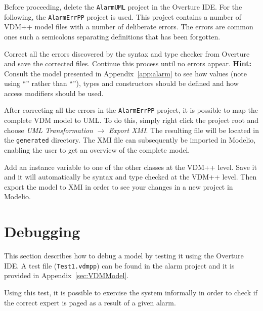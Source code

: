 Before proceeding, delete the \texttt{AlarmUML} project in the Overture IDE. For the following, the \texttt{AlarmErrPP} project is used. This project contains a number of VDM++ model files with a number of deliberate errors.  The errors are common ones such a semicolons separating definitions that has been forgotten.

\begin{myexercise}\label{ex:type-errors}
Correct all the errors discovered by the syntax and type checker from
Overture and save the corrected files. Continue this process until no errors appear.
\textbf{Hint:} Consult the model presented in
Appendix~\ref{app:alarm}
to see how values (note using ``\vdmstyle{=}'' rather than
``\vdmstyle{:=}''), types and constructors should be defined and how
access modifiers should be used.
\end{myexercise}


After correcting all the errors in the \texttt{AlarmErrPP} project, it is possible to map the complete VDM model to UML. To do this, simply right click the project root and choose \emph{UML Transformation} $\rightarrow $ \emph{Export XMI}. The resulting file will be located in the \texttt{generated} directory.  The XMI file can subsequently be
imported in Modelio, enabling the user to get an overview of the complete model.

\begin{myexercise}\label{ex:rosemapping}
Add an instance variable to one of the other classes at the VDM++ level. Save it and it will automatically be syntax and type checked at the VDM++ level. Then export the model to XMI in order to see your changes in a new project in Modelio.
\end{myexercise}
%
\section{Debugging}\label{sec:debugging}
This section describes how to debug a model by testing it using the Overture IDE. A test file (\texttt{Test1.vdmpp}) can be found in the alarm project and it is provided in Appendix~\ref{sec:VDMModel}.

\lstset{language=VDM++}
%

Using this test, it is possible to exercise the system informally in order to check if the correct expert is paged as a result of a given alarm.
%
